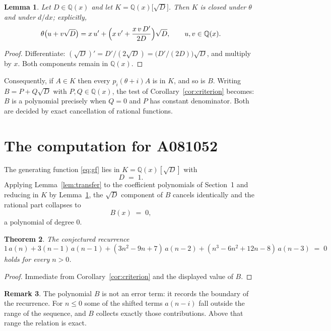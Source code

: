 \documentclass[11pt,a4paper]{article}
\theoremstyle{plain}
\newtheorem{theorem}{Theorem}
\newtheorem{lemma}[theorem]{Lemma}
\theoremstyle{definition}
\newtheorem{remark}[theorem]{Remark}
\begin{document}
\begin{lemma}\label{lem:field}
Let $D\in\mathbb{Q}(x)$ and let $K=\mathbb{Q}(x)\bigl[\sqrt{D}\bigr]$. Then $K$ is closed
under $\theta$ and under $d/dx$; explicitly,
\[
\theta\bigl(u+v\sqrt{D}\bigr)=x\,u'+\Bigl(x\,v'+\frac{x\,v\,D'}{2D}\Bigr)\sqrt{D},
\qquad u,v\in\mathbb{Q}(x).
\]
\end{lemma}

\begin{proof}
Differentiate: $(\sqrt{D})'=D'/(2\sqrt{D})=\bigl(D'/(2D)\bigr)\sqrt{D}$, and multiply by
$x$. Both components remain in $\mathbb{Q}(x)$.
\end{proof}

Consequently, if $A\in K$ then every $p_{i}(\theta+i)A$ is in $K$, and so is $B$. Writing
$B=P+Q\sqrt{D}$ with $P,Q\in\mathbb{Q}(x)$, the test of Corollary~\ref{cor:criterion}
becomes: $B$ is a polynomial precisely when $Q=0$ and $P$ has constant denominator. Both
are decided by exact cancellation of rational functions.

\section{The computation for A081052}

The generating function \eqref{eq:gf} lies in $K=\mathbb{Q}(x)[\sqrt{D}]$ with
\[
D \;=\; 1 .
\]
Applying Lemma~\ref{lem:transfer} to the coefficient polynomials of Section~1 and reducing
in $K$ by Lemma~\ref{lem:field}, the $\sqrt{D}$ component of $B$ cancels identically and
the rational part collapses to
\[
B(x)\;=\;0 ,
\]
a polynomial of degree $0$.

\begin{theorem}
The conjectured recurrence
\[
1\,a(n) + 3 \left(n - 1\right)\,a(n-1) + (3 n^{2} - 9 n + 7)\,a(n-2) + (n^{3} - 6 n^{2} + 12 n - 8)\,a(n-3) \;=\;0
\]
holds for every $n>0$.
\end{theorem}

\begin{proof}
Immediate from Corollary~\ref{cor:criterion} and the displayed value of $B$.
\end{proof}

\begin{remark}
The polynomial $B$ is not an error term: it records the boundary of the recurrence. For
$n\le0$ some of the shifted terms $a(n-i)$ fall outside the range of the sequence,
and $B$ collects exactly those contributions. Above that range the relation is exact.
\end{remark}
\end{document}

